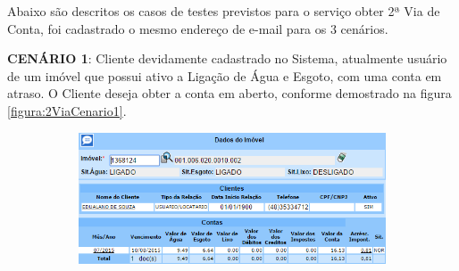 Abaixo são descritos os casos de testes previstos para o serviço obter 2ª Via de Conta, foi cadastrado o mesmo endereço de e-mail para os 3 cenários.
\begin{flushleft}
	\begin{description}
		\item \textbf{CENÁRIO 1}: Cliente devidamente cadastrado no Sistema, atualmente usuário de um imóvel que possui ativo a Ligação de Água e Esgoto, com uma conta em atraso. O Cliente deseja obter a conta em aberto, conforme demostrado na figura \ref{figura:2ViaCenario1}.
		
		\begin{figure}[H]
			\centering
			\caption{\textbf{Obter 2ª via - Cenário de Teste 1}}
			\label{figura:2ViaCenario1}
			\begin{subfigure}[H]{\textwidth}
				\centering
				\includegraphics{figuras/cenarios/segunda_via/cenario_1.PNG}
			\end{subfigure}
		\end{figure}
	\end{description}
	

\end{flushleft}

